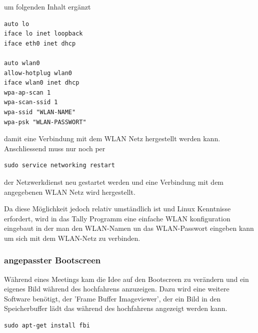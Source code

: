 \documentclass[11pt,a4paper]{article} %
\begin{document}
um folgenden Inhalt ergänzt
\begin{frame}

\begin{lstlisting}
auto lo
iface lo inet loopback
iface eth0 inet dhcp

auto wlan0
allow-hotplug wlan0
iface wlan0 inet dhcp
wpa-ap-scan 1
wpa-scan-ssid 1
wpa-ssid "WLAN-NAME"
wpa-psk "WLAN-PASSWORT"

\end{lstlisting}

\end{frame}

damit eine Verbindung mit dem WLAN Netz hergestellt werden kann.
Anschliessend muss nur noch per
\begin{frame}

\begin{lstlisting}
sudo service networking restart
\end{lstlisting}

\end{frame}
der Netzwerkdienst neu gestartet werden und eine Verbindung mit dem angegebenen WLAN Netz wird hergestellt.
\par
Da diese Möglichkeit jedoch relativ umständlich ist und Linux Kenntnisse erfordert, wird in das Tally Programm eine einfache WLAN konfiguration eingebaut in der man den WLAN-Namen un das WLAN-Passwort eingeben kann um sich mit dem WLAN-Netz zu verbinden.

\subsubsection{angepasster Bootscreen}
Während eines Meetings kam die Idee auf den Bootscreen zu verändern und ein eigenes Bild während des hochfahrens anzuzeigen. Dazu wird eine weitere Software benötigt, der 'Frame Buffer Imageviewer', der ein Bild in den Speicherbuffer lädt das während des hochfahrens angezeigt werden kann. \cite{7}
\begin{frame}

\begin{lstlisting}
sudo apt-get install fbi
\end{lstlisting}

\end{frame}
\end{document}
